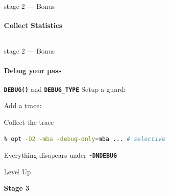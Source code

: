 \documentclass[14pt]{beamer}
\newcommand{\Code}[1]{\textbf{\texttt{#1}}}
\begin{document}
    \begin{frame}[containsverbatim]{stage 2 --- Bonus}
        \framesubtitle{Collect Statistics}
        {
        \footnotesize
        
        }
        \vspace{-1em}%
        \hspace{-5.5em}%
        \begin{minipage}{\textwidth}
            \footnotesize
            
        \end{minipage}

        {
        \footnotesize
\begin{lstlisting}[language=bash]
% opt -load LLVMMBA.so -mba -stats ...
\end{lstlisting}
        }
    \end{frame}

    \begin{frame}[containsverbatim]{stage 2 --- Bonus}
        \framesubtitle{Debug your pass}
        \begin{alertblock}{\Code{DEBUG()} and \Code{DEBUG\_TYPE}}
        Setup a guard:
        {
        \footnotesize
        
        }
        Add a trace:\\
        \hspace{-6em}%
        \begin{minipage}{\textwidth}
        \footnotesize
        
        \end{minipage}
        \end{alertblock}
        \begin{block}{Collect the trace}
        {
        \footnotesize
        \begin{lstlisting}[language=bash]
% opt -O2 -mba -debug ... # verbose
% opt -O2 -mba -debug-only=mba ... # selective
        \end{lstlisting}
        }
        \end{block}
        Everything disapears under \Code{-DNDEBUG}
    \end{frame}

    \begin{frame}{Level Up}
        \begin{center}
            \textbf{\Large Stage 3}
        \end{center}
    \end{frame}
\end{document}
